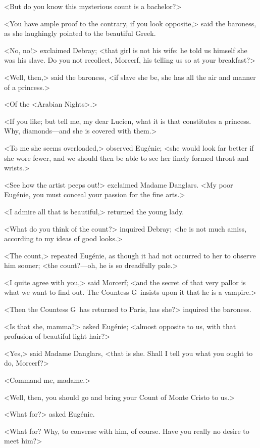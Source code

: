  <But do you know this mysterious count is a bachelor?> 

 <You have ample proof to the contrary, if you look opposite,> said the baroness, as she laughingly pointed to the beautiful Greek. 

 <No, no!> exclaimed Debray; <that girl is not his wife: he told us himself she was his slave. Do you not recollect, Morcerf, his telling us so at your breakfast?> 

 <Well, then,> said the baroness, <if slave she be, she has all the air and manner of a princess.> 

 <Of the <Arabian Nights>.> 

 <If you like; but tell me, my dear Lucien, what it is that constitutes a princess. Why, diamonds—and she is covered with them.> 

 <To me she seems overloaded,> observed Eugénie; <she would look far better if she wore fewer, and we should then be able to see her finely formed throat and wrists.> 

 <See how the artist peeps out!> exclaimed Madame Danglars. <My poor Eugénie, you must conceal your passion for the fine arts.> 

 <I admire all that is beautiful,> returned the young lady. 

 <What do you think of the count?> inquired Debray; <he is not much amiss, according to my ideas of good looks.> 

 <The count,> repeated Eugénie, as though it had not occurred to her to observe him sooner; <the count?—oh, he is so dreadfully pale.> 

 <I quite agree with you,> said Morcerf; <and the secret of that very pallor is what we want to find out. The Countess G\doubleemdash~insists upon it that he is a vampire.> 

 <Then the Countess G\doubleemdash~has returned to Paris, has she?> inquired the baroness. 

 <Is that she, mamma?> asked Eugénie; <almost opposite to us, with that profusion of beautiful light hair?> 

 <Yes,> said Madame Danglars, <that is she. Shall I tell you what you ought to do, Morcerf?> 

 <Command me, madame.> 

 <Well, then, you should go and bring your Count of Monte Cristo to us.> 

 <What for?> asked Eugénie. 

 <What for? Why, to converse with him, of course. Have you really no desire to meet him?> 


